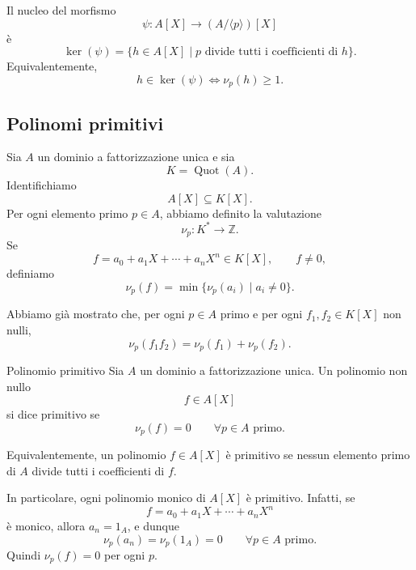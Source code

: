 \documentclass[a4paper]{article}
\begin{document}
\begin{radioactive}
\begin{snippetremark}{}
    Il nucleo del morfismo
    \[
        \psi\colon A[X]\to (A/\langle p \rangle)[X]
    \]
    è
    \[
        \ker(\psi)
        =
        \{h\in A[X]\mid p \text{ divide tutti i coefficienti di } h\}.
    \]
    Equivalentemente,
    \[
        h\in \ker(\psi)
        \iff
        \nu_p(h)\geq 1.
    \]
\end{snippetremark}
\end{radioactive}

\pagebreak

\subsection{Polinomi primitivi}

\begin{radioactive}
Sia \(A\) un dominio a fattorizzazione unica e sia
\[
    K=\operatorname{Quot}(A).
\]
Identifichiamo
\[
    A[X]\subseteq K[X].
\]
Per ogni elemento primo \(p\in A\), abbiamo definito la valutazione
\[
    \nu_p\colon K^\ast\to \mathbb{Z}.
\]
Se
\[
    f=a_0+a_1X+\cdots+a_nX^n\in K[X],
    \qquad
    f\neq 0,
\]
definiamo
\[
    \nu_p(f)
    =
    \min\{\nu_p(a_i)\mid a_i\neq 0\}.
\]

Abbiamo già mostrato che, per ogni \(p\in A\) primo e per ogni \(f_1,f_2\in K[X]\) non nulli,
\[
    \nu_p(f_1f_2)
    =
    \nu_p(f_1)+\nu_p(f_2).
\]
\end{radioactive}

\begin{radioactive}
\begin{snippetdefinition}{Polinomio primitivo}
    Sia \(A\) un dominio a fattorizzazione unica.
    Un polinomio non nullo
    \[
        f\in A[X]
    \]
    si dice primitivo se
    \[
        \nu_p(f)=0
        \qquad
        \forall p\in A \text{ primo}.
    \]
\end{snippetdefinition}
\end{radioactive}

\begin{radioactive}
Equivalentemente, un polinomio \(f\in A[X]\) è primitivo se nessun elemento primo di \(A\) divide tutti i coefficienti di \(f\).

In particolare, ogni polinomio monico di \(A[X]\) è primitivo. Infatti, se
\[
    f=a_0+a_1X+\cdots+a_nX^n
\]
è monico, allora \(a_n=1_A\), e dunque
\[
    \nu_p(a_n)=\nu_p(1_A)=0
    \qquad
    \forall p\in A \text{ primo}.
\]
Quindi \(\nu_p(f)=0\) per ogni \(p\).
\end{radioactive}
\end{document}
